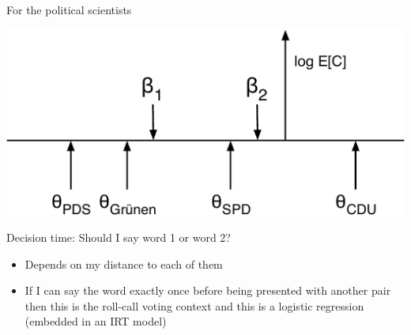 \documentclass{hertieteaching}
\begin{document}
\begin{frame}{For the political scientists}

\centerline{\includegraphics[scale=0.4]{pictures/ip-schematic3-cropped}}
\medskip

Decision time: Should I say word 1 or word 2?
\begin{itemize}
  \item Depends on my distance to each of them
  \item If I can say the word exactly once before being presented with another pair then this is the roll-call voting context and this is a logistic regression (embedded in an IRT model) 
\end{itemize}
\end{frame}



\end{document}
